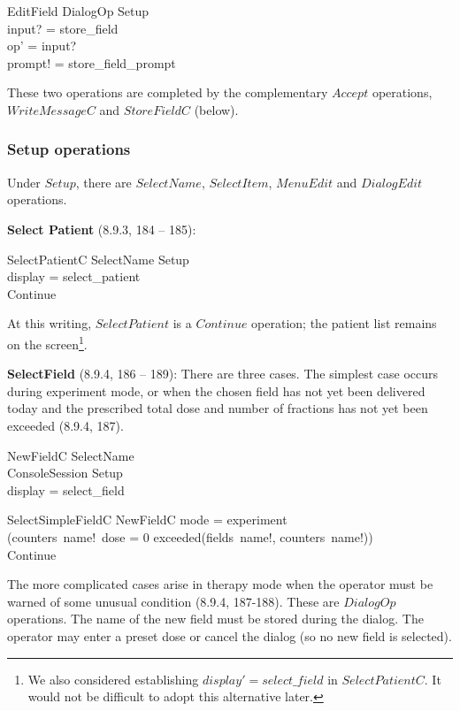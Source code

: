 \documentclass{article}
\begin{document}
\begin{schema}{EditField}
	DialogOp
\where
	Setup \\
	input? = store\_field \\
	op' = input? \\
	prompt! = store\_field\_prompt
\end{schema}
These two operations are completed by the complementary $Accept$
operations, $WriteMessageC$ and $StoreFieldC$ (below).

\subsubsection{Setup operations}

Under $Setup$, there are $SelectName$, $SelectItem$, $MenuEdit$ and
$DialogEdit$ operations.

{\bf Select Patient} (8.9.3, 184 -- 185):

\begin{schema}{SelectPatientC}
	SelectName
\where
	Setup \\
	display = select\_patient \\
	Continue
\end{schema}
At this writing, $SelectPatient$ is a $Continue$ operation; the
patient list remains on the screen\footnote{We also considered
establishing $display' = select\_field$ in $SelectPatientC$.  It would
not be difficult to adopt this alternative later.}.

{\bf SelectField} (8.9.4, 186 -- 189): There are three cases.  The
simplest case occurs during experiment mode, or when the chosen field
has not yet been delivered today and the prescribed total dose and
number of fractions has not yet been exceeded (8.9.4, 187).

\begin{schema}{NewFieldC}
	SelectName \\
	ConsoleSession
\where
	Setup \\
	display = select\_field \\
\end{schema}

\begin{schema}{SelectSimpleFieldC}
	NewFieldC
\where
	mode = experiment \\
	\lor (counters~name!~dose = 0 \land \lnot exceeded(fields~name!, counters~name!)) \\
	Continue
\end{schema}
The more complicated cases arise in therapy mode when the operator
must be warned of some unusual condition (8.9.4, 187-188).  These are
$DialogOp$ operations. The name of the new field must be stored during
the dialog.  The operator may enter a preset dose or cancel
the dialog (so no new field is selected).
\end{document}

